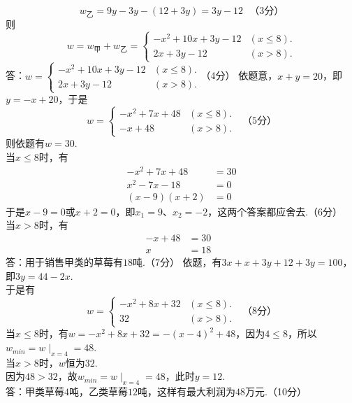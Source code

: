 \documentclass[10pt]{article}
\begin{document}
\begin{questions}{\answeringintroduction}
\begin{subquestions}
            $$w_乙 = 9y-3y-(12+3y) = 3y-12 \ \ \ （3分）$$
            则
            $$w = w_甲+w_乙 =
            \begin{cases}
                -x^2+10x+3y-12 & (x \leq 8). \\
                2x+3y-12 & (x > 8).
            \end{cases}$$
            答：$w = \begin{cases}
                -x^2+10x+3y-12 & (x \leq 8). \\
                2x+3y-12 & (x > 8).
            \end{cases}$（4分）
            \newpage
        \subquestion 依题意，$x+y=20$，即$y=-x+20$，于是
        $$w = \begin{cases}
            -x^2+7x+48 & (x \leq 8). \\
            -x+48 & (x > 8).
        \end{cases} \ \ \ （5分）$$
        则依题有$w = 30$.\\
        当$x \leq 8$时，有
        $$\begin{aligned}
            -x^2+7x+48 &= 30 \\
            x^2-7x-18  &= 0 \\
            (x-9)(x+2) &= 0
        \end{aligned}$$
        于是$x-9=0$或$x+2=0$，即$x_1=9$、$x_2=-2$，这两个答案都应舍去.（6分）\\
        当$x > 8$时，有
        $$\begin{aligned}
            -x+48 &= 30 \\
            x &= 18 \ \ \
        \end{aligned}$$
        答：用于销售甲类的草莓有$18$吨.（7分）
        \subquestion 依题，有$3x+x+3y+12+3y=100$，即$3y=44-2x$. \\
        于是有
        $$w = \begin{cases}
            -x^2+8x+32 & (x \leq 8). \\
            32 & (x > 8).
        \end{cases} \ \ \ （8分）$$
        当$x \leq 8$时，有$w = -x^2+8x+32 = -(x-4)^2 + 48$，因为$4 \leq 8$，所以$w_{min} = w\mid_{x=4} = 48$. \\
        当$x > 8$时，$w$恒为$32$. \\
        因为$48 > 32$，故$w_{min} = w\mid_{x=4} = 48$，此时$y=12$. \\
        答：甲类草莓$4$吨，乙类草莓$12$吨，这样有最大利润为$48$万元.（10分）
    \end{subquestions}

\end{questions}
\end{document}

